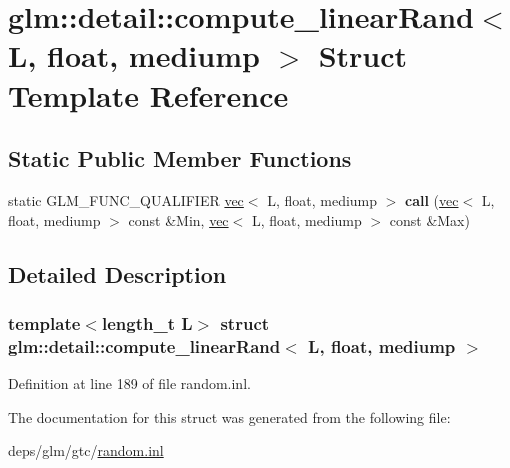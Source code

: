 \hypertarget{structglm_1_1detail_1_1compute__linearRand_3_01L_00_01float_00_01mediump_01_4}{}\section{glm\+:\+:detail\+:\+:compute\+\_\+linear\+Rand$<$ L, float, mediump $>$ Struct Template Reference}
\label{structglm_1_1detail_1_1compute__linearRand_3_01L_00_01float_00_01mediump_01_4}
\subsection*{Static Public Member Functions}
\begin{DoxyCompactItemize}
\item 
\mbox{\label{structglm_1_1detail_1_1compute__linearRand_3_01L_00_01float_00_01mediump_01_4_a044975eb9fecb662ddbcac1b4e2bcd1d}} 
static G\+L\+M\+\_\+\+F\+U\+N\+C\+\_\+\+Q\+U\+A\+L\+I\+F\+I\+ER \hyperlink{structglm_1_1vec}{vec}$<$ L, float, mediump $>$ {\bfseries call} (\hyperlink{structglm_1_1vec}{vec}$<$ L, float, mediump $>$ const \&Min, \hyperlink{structglm_1_1vec}{vec}$<$ L, float, mediump $>$ const \&Max)
\end{DoxyCompactItemize}


\subsection{Detailed Description}
\subsubsection*{template$<$length\+\_\+t L$>$\newline
struct glm\+::detail\+::compute\+\_\+linear\+Rand$<$ L, float, mediump $>$}



Definition at line 189 of file random.\+inl.



The documentation for this struct was generated from the following file\+:\begin{DoxyCompactItemize}
\item 
deps/glm/gtc/\hyperlink{random_8inl}{random.\+inl}\end{DoxyCompactItemize}
